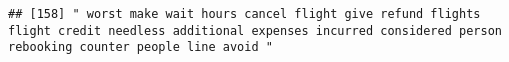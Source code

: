 \documentclass[
]{article}
\begin{document}
\begin{verbatim}
## [158] " worst make wait hours cancel flight give refund flights flight credit needless additional expenses incurred considered person rebooking counter people line avoid "                                                                                                                                                                                                                                                                                                                                                                                                                                                                                                                                                                                                                                                                                                                                                                                                                                                                                                                                                                                                                                                                                                                                                                                                                                                                                                                                                                                                                                                                                                                                                                                                                           

\end{verbatim}
\end{document}

